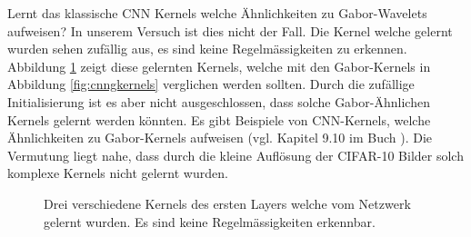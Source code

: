 Lernt das klassische CNN Kernels welche Ähnlichkeiten zu Gabor-Wavelets aufweisen?
In unserem Versuch ist dies nicht der Fall.
Die Kernel welche gelernt wurden sehen zufällig aus, es sind keine Regelmässigkeiten zu erkennen.
Abbildung \ref{fig:cnnkernels} zeigt diese gelernten Kernels, welche mit den Gabor-Kernels in Abbildung \ref{fig:cnngkernels} verglichen werden sollten.
Durch die zufällige Initialisierung ist es aber nicht ausgeschlossen, dass solche Gabor-Ähnlichen Kernels gelernt werden könnten.
Es gibt Beispiele von CNN-Kernels, welche Ähnlichkeiten zu Gabor-Kernels aufweisen (vgl. Kapitel 9.10 im Buch \cite{book:deeplearning}).
Die Vermutung liegt nahe, dass durch die kleine Auflösung der CIFAR-10 Bilder solch komplexe Kernels nicht gelernt wurden.

\begin{figure}
	\centering
	\caption{Drei verschiedene Kernels des ersten Layers welche vom Netzwerk gelernt wurden. Es sind keine Regelmässigkeiten erkennbar.}
	\label{fig:cnnkernels}
\end{figure}

